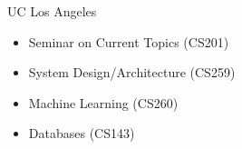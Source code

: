 \begin{cvcourses}
  \cvcourselist
    {UC Los Angeles} %
    {
      \begin{multicols}{3}
        \begin{itemize}
          \item Seminar on Current Topics (CS201) %
          \item System Design/Architecture (CS259) %
          \item Machine Learning (CS260) %
          \item Databases (CS143) %

\end{itemize}
\end{multicols}}
\end{cvcourses}
